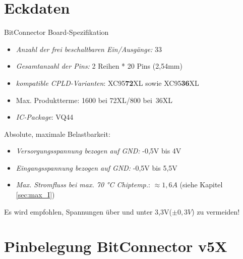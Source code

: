 \documentclass{article}
\begin{document}
\section{Eckdaten} 

BitConnector Board-Spezifikation
\begin{itemize}
	\item \textit{Anzahl der frei beschaltbaren Ein/Ausgänge:} \hspace{0.3cm} 33
	\item \textit{Gesamtanzahl der Pins:} \hspace{3.6cm} 2 Reihen * 20 Pins (2,54mm)
	\item \textit{kompatible CPLD-Varianten}: \hspace{2.8cm} XC95\textbf{72}XL sowie XC95\textbf{36}XL
	\item Max. Produktterme: \hspace{4.1cm} 1600 bei 72XL/800 bei~36XL
	\item \textit{IC-Package}: \hspace{5.3cm} VQ44 
\end{itemize}

Absolute, maximale Belastbarkeit:
\begin{itemize}
	\item \textit{Versorgungsspannung bezogen auf GND:} \hspace{1cm} -0,5V bis 4V
	\item \textit{Eingangsspannung bezogen auf GND:} \hspace{1.45cm} -0,5V bis 5,5V
	\item \textit{Max. Stromfluss bei max. 70 \si{\celsius} Chiptemp.}:\hspace{0.6cm} $\approx1,6A$ (siehe Kapitel \ref{sec:max_I})
\end{itemize}

Es wird empfohlen, Spannungen über und unter 3,3V($\pm 0,3V$) zu vermeiden!

\section{Pinbelegung BitConnector v5X}
\label{sec:Pins}
\end{document}
